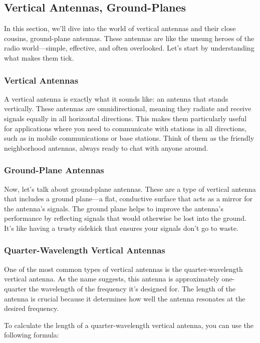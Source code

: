 \subsection{Vertical Antennas, Ground-Planes}
\label{subsec:verticals}

In this section, we'll dive into the world of vertical antennas and their close cousins, ground-plane antennas. These antennas are like the unsung heroes of the radio world—simple, effective, and often overlooked. Let's start by understanding what makes them tick.

\subsubsection*{Vertical Antennas}
A vertical antenna is exactly what it sounds like: an antenna that stands vertically. These antennas are omnidirectional, meaning they radiate and receive signals equally in all horizontal directions. This makes them particularly useful for applications where you need to communicate with stations in all directions, such as in mobile communications or base stations. Think of them as the friendly neighborhood antennas, always ready to chat with anyone around.

\subsubsection*{Ground-Plane Antennas}
Now, let's talk about ground-plane antennas. These are a type of vertical antenna that includes a ground plane—a flat, conductive surface that acts as a mirror for the antenna's signals. The ground plane helps to improve the antenna's performance by reflecting signals that would otherwise be lost into the ground. It's like having a trusty sidekick that ensures your signals don't go to waste.

\subsubsection*{Quarter-Wavelength Vertical Antennas}
One of the most common types of vertical antennas is the quarter-wavelength vertical antenna. As the name suggests, this antenna is approximately one-quarter the wavelength of the frequency it's designed for. The length of the antenna is crucial because it determines how well the antenna resonates at the desired frequency. 

To calculate the length of a quarter-wavelength vertical antenna, you can use the following formula:

